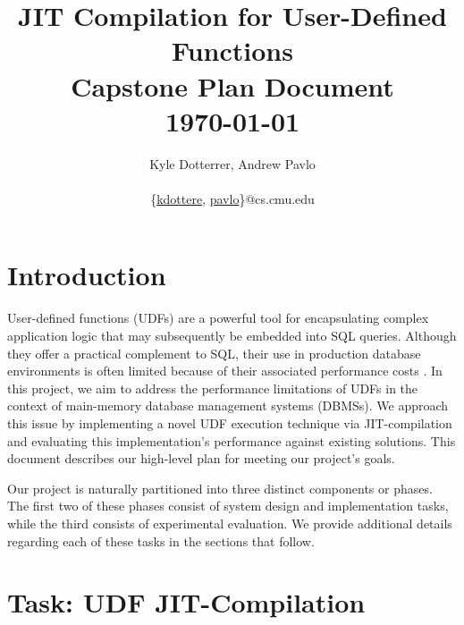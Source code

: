 \documentclass{vldb}
\newcommand{\paperTitle}{JIT Compilation for User-Defined Functions\\ 
    \large Capstone Plan Document\\
    \today}
\begin{document}
\title{\paperTitle}

\author{
    \alignauthor Kyle Dotterrer, Andrew Pavlo\\
    \\
    \email 
        \{\href{mailto:kdottere@cs.cmu.edu}{kdottere},
        \href{mailto:pavlo@cs.cmu.edu}{pavlo}\}@cs.cmu.edu\\
}

\makeatletter
\def\@copyrightspace{\relax}
\makeatother

\maketitle


\section{Introduction}

User-defined functions (UDFs) are a powerful tool for encapsulating complex application logic that may subsequently be embedded into SQL queries. Although they offer a practical complement to SQL, their use in production database environments is often limited because of their associated performance costs \cite{froid, apfel}. In this project, we aim to address the performance limitations of UDFs in the context of main-memory database management systems (DBMSs). We approach this issue by implementing a novel UDF execution technique via JIT-compilation and evaluating this implementation's performance against existing solutions. This document describes our high-level plan for meeting our project's goals.

Our project is naturally partitioned into three distinct components or phases. The first two of these phases consist of system design and implementation tasks, while the third consists of experimental evaluation. We provide additional details regarding each of these tasks in the sections that follow.


\section{Task: UDF JIT-Compilation}
\end{document}
